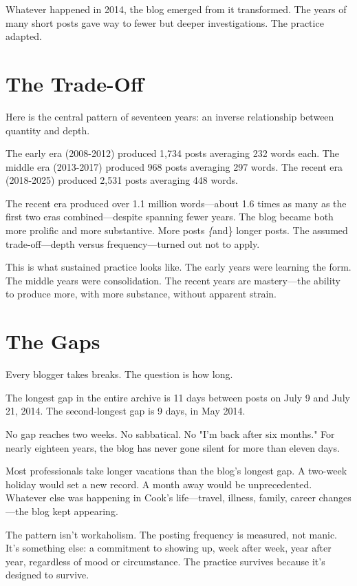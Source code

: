 Whatever happened in 2014, the blog emerged from it transformed. The years of many short posts gave way to fewer but deeper investigations. The practice adapted.

\bigskip

\section*{The Trade-Off}

Here is the central pattern of seventeen years: an inverse relationship between quantity and depth.

The early era (2008-2012) produced 1,734 posts averaging 232 words each.
The middle era (2013-2017) produced 968 posts averaging 297 words.
The recent era (2018-2025) produced 2,531 posts averaging 448 words.

The recent era produced over 1.1 million words—about 1.6 times as many as the first two eras combined—despite spanning fewer years. The blog became both more prolific and more substantive. More posts \textit\{and\} longer posts. The assumed trade-off—depth versus frequency—turned out not to apply.

This is what sustained practice looks like. The early years were learning the form. The middle years were consolidation. The recent years are mastery—the ability to produce more, with more substance, without apparent strain.

\bigskip

\section*{The Gaps}

Every blogger takes breaks. The question is how long.

The longest gap in the entire archive is 11 days between posts on July 9 and July 21, 2014. The second-longest gap is 9 days, in May 2014.

No gap reaches two weeks. No sabbatical. No "I'm back after six months." For nearly eighteen years, the blog has never gone silent for more than eleven days.

Most professionals take longer vacations than the blog's longest gap. A two-week holiday would set a new record. A month away would be unprecedented. Whatever else was happening in Cook's life—travel, illness, family, career changes—the blog kept appearing.

The pattern isn't workaholism. The posting frequency is measured, not manic. It's something else: a commitment to showing up, week after week, year after year, regardless of mood or circumstance. The practice survives because it's designed to survive.

